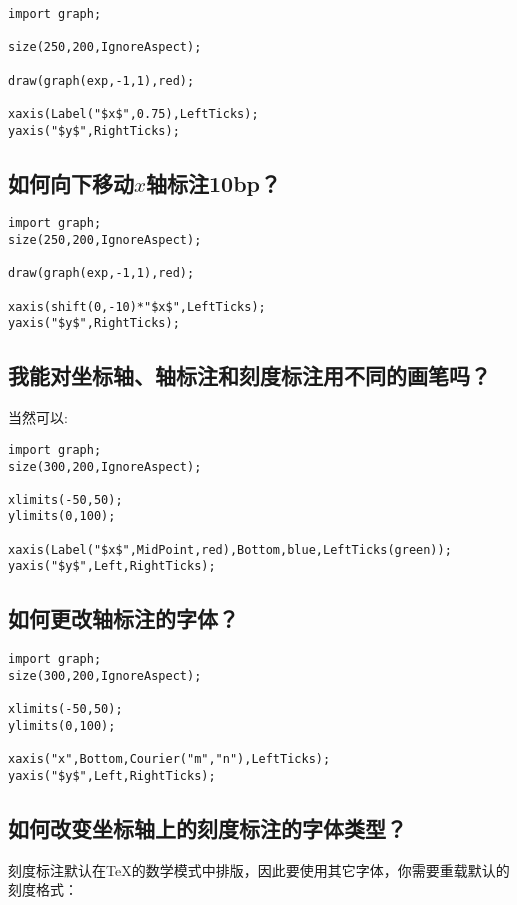 \begin{lstlisting}
import graph;

size(250,200,IgnoreAspect);

draw(graph(exp,-1,1),red);

xaxis(Label("$x$",0.75),LeftTicks);
yaxis("$y$",RightTicks);
\end{lstlisting}

\subsection{\label{Q6.3}如何向下移动$x$轴标注10bp？}

\begin{lstlisting}
import graph;
size(250,200,IgnoreAspect);

draw(graph(exp,-1,1),red);

xaxis(shift(0,-10)*"$x$",LeftTicks);
yaxis("$y$",RightTicks);
\end{lstlisting}

\subsection{\label{Q6.4}我能对坐标轴、轴标注和刻度标注用不同的画笔吗？}

当然可以:
\begin{lstlisting}
import graph;
size(300,200,IgnoreAspect);

xlimits(-50,50);
ylimits(0,100);

xaxis(Label("$x$",MidPoint,red),Bottom,blue,LeftTicks(green));
yaxis("$y$",Left,RightTicks);
\end{lstlisting}

\subsection{\label{Q6.5}如何更改轴标注的字体？}

\begin{lstlisting}
import graph;
size(300,200,IgnoreAspect);

xlimits(-50,50);
ylimits(0,100);

xaxis("x",Bottom,Courier("m","n"),LeftTicks);
yaxis("$y$",Left,RightTicks);
\end{lstlisting}

\subsection{\label{Q6.6}如何改变坐标轴上的刻度标注的字体类型？}
刻度标注默认在TeX的数学模式中排版，因此要使用其它字体，你需要重载默认的刻度格式：

